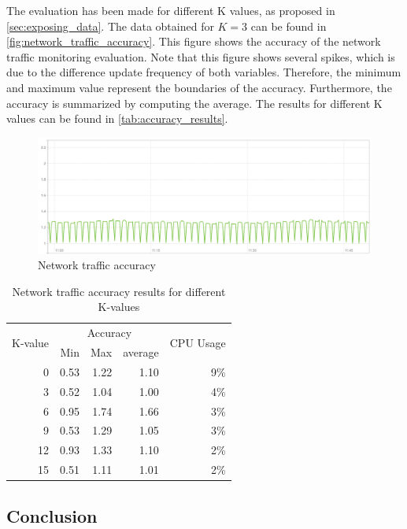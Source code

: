 \noindent
The evaluation has been made for different K values, as proposed in \autoref{sec:exposing_data}. The data obtained for $K = 3$ can be found in \autoref{fig:network_traffic_accuracy}. This figure shows the accuracy of the network traffic monitoring evaluation. Note that this figure shows several spikes, which is due to the difference update frequency of 
both variables. Therefore, the minimum and maximum value represent the boundaries of the accuracy. Furthermore, the accuracy is summarized by computing the average. The results for different K values can be found in \autoref{tab:accuracy_results}.

\begin{figure}
    \centering
    \includegraphics[width=\textwidth]{gfx/traffic_network_accuracy}
    \caption{Network traffic accuracy}
    \label{fig:network_traffic_accuracy}
\end{figure}

\begin{table}[ht]
    \centering
    \begin{tabular}{r|rrr|r}
        \multirow{2}{*}{K-value} & \multicolumn{3}{c|}{Accuracy} & \multirow{2}{*}{CPU Usage} \\
        & Min & Max & average & \\ \hline        
        0 & 0.53& 1.22& 1.10& 9\% \\
        3 & 0.52& 1.04& 1.00& 4\% \\
        6 & 0.95& 1.74& 1.66& 3\% \\
        9 & 0.53& 1.29& 1.05& 3\% \\
        12& 0.93& 1.33& 1.10& 2\% \\
        15& 0.51& 1.11& 1.01& 2\% \\        
    \end{tabular}
    \caption{Network traffic accuracy results for different K-values}
    \label{tab:accuracy_results}
\end{table}

\subsection{Conclusion} \label{sec:accuracy_conclusion}


